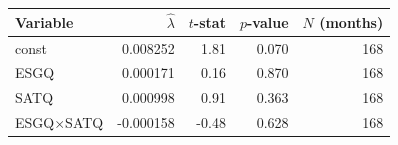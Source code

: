 \begin{tabular}{lrrrr}
\toprule
Variable & $\hat{\lambda}$ & $t$-stat & $p$-value & $N$ (months) \\
\midrule
const & 0.008252 & 1.81 & 0.070 & 168 \\
ESGQ & 0.000171 & 0.16 & 0.870 & 168 \\
SATQ & 0.000998 & 0.91 & 0.363 & 168 \\
ESGQ$\times$SATQ & -0.000158 & -0.48 & 0.628 & 168 \\
\bottomrule
\end{tabular}